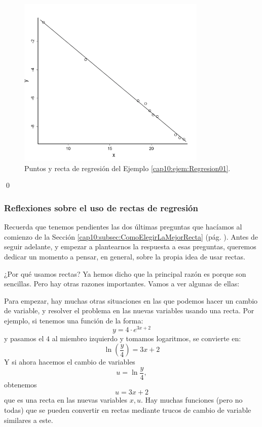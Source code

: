 \begin{ejemplo}
\begin{figure}[htbp]
\begin{center}
\begin{enColor}
\end{enColor}
\begin{bn}
\includegraphics[width=9cm]{../fig/Cap10-EjemploRegresion01-bn.png}
\end{bn}
\caption{Puntos y recta de regresión del Ejemplo \ref{cap10:ejem:Regresion01}.}
\label{cap10:fig:EjemploRegresion01}
\end{center}
\end{figure}


\qed
\end{ejemplo}

\subsubsection{Reflexiones sobre el uso de rectas de regresión}
\label{cap10:subsubsec:ReflexionUsoRectaRegresion}

Recuerda que tenemos pendientes las dos últimas preguntas que hacíamos al comienzo de la Sección \ref{cap10:subsec:ComoElegirLaMejorRecta} (pág. \pageref{cap10:subsec:ComoElegirLaMejorRecta}). Antes de seguir adelante, y empezar a plantearnos la respuesta a esas preguntas, queremos dedicar un momento a pensar, en general, sobre la propia idea de usar rectas.

¿Por qué usamos rectas? Ya hemos dicho que la principal razón es porque son sencillas. Pero hay otras razones importantes. Vamos a ver algunas de ellas:

Para empezar, hay muchas otras situaciones en las que podemos hacer un cambio de variable, y resolver el problema en las nuevas variables usando una recta. Por ejemplo, si tenemos una función de la forma:
        \[y=4\cdot e^{3x+2}\]
y pasamos el $4$ al miembro izquierdo y tomamos logaritmos, se convierte en:
        \[\ln\left(\dfrac{y}{4}\right)=3x+2\]
Y si ahora hacemos el cambio de variables \[u=\ln\frac{y}{4},\] obtenemos
        \[u=3x+2\]
que es una recta en las nuevas variables $x,u$.  Hay muchas funciones (pero no todas)
que se pueden convertir en rectas mediante trucos de cambio de variable similares a este.

